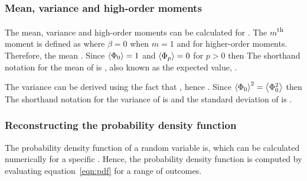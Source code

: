 \subsubsection*{Mean, variance and high-order moments}
The mean, variance and high-order moments can be calculated for .
The $m$\textsuperscript{th} moment  is defined as
where $\beta = 0$ when $m = 1$ and  for higher-order moments.
Therefore, the mean .
Since $\left\langle \Phi_0 \right\rangle = 1$ and $\left\langle \Phi_p \right\rangle = 0$ for $p > 0$ then
The shorthand notation for the mean of  is , also known as the expected value, \rev{$\E\left[A\right]$}.

The variance  can be derived using the fact that , hence .
Since $\left\langle \Phi_0 \right\rangle^2 = \left\langle \Phi_0^2 \right\rangle$ then
The shorthand notation for the variance of  is  and the standard deviation of  is .

\subsubsection*{Reconstructing the probability density function}
The probability density function  of a random variable  is,
which can be calculated numerically for a specific .
Hence, the probability density function is computed by evaluating equation~\eqref{eqn:pdf} for a range of outcomes.

